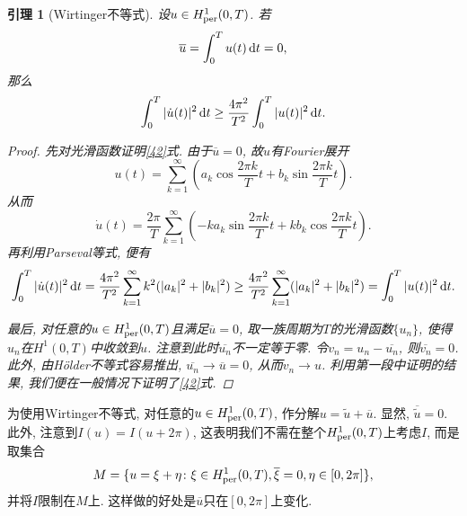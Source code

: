 \documentclass[12pt,a4paper]{article}
\newtheorem{lemma}[theorem]{引理}
\begin{document}
\begin{lemma}[Wirtinger不等式]
    设$u \in H_{{\rm per}}^1(0, T)$. 若 
    \begin{equation*}
        \overline{u} = \int_0^Tu(t) \,{\rm d}t = 0,
    \end{equation*}
    那么 
    \begin{equation}\label{42}
        \int_0^T|\dot u(t)|^2 \,{\rm d}t \geq \frac{4\pi^2}{T^2}\int_0^T|u(t)|^2 \,{\rm d}t.
    \end{equation}
    \begin{proof}
        先对光滑函数证明\eqref{42}式. 由于$\overline{u} = 0$, 故$u$有Fourier展开 
        \begin{equation*}
            u(t) = \sum_{k = 1}^{\infty}\left(a_k\cos\frac{2\pi k}{T}t + b_k\sin\frac{2\pi k}{T}t\right).
        \end{equation*}
        从而 
        \begin{equation*}
            \dot u(t) = \frac{2\pi}{T}\sum_{k = 1}^{\infty}\left(-ka_k\sin\frac{2\pi k}{T}t + kb_k\cos\frac{2\pi k}{T}t\right).
        \end{equation*}
        再利用Parseval等式, 便有 
        \begin{align*}
            \int_0^T|\dot u(t)|^2 \,{\rm d}t = \frac{4\pi^2}{T^2}\sum_{k = 1}^{\infty}k^2(|a_k|^2 + |b_k|^2) \geq \frac{4\pi^2}{T^2}\sum_{k = 1}^{\infty}(|a_k|^2 + |b_k|^2) = \int_0^T|u(t)|^2 \,{\rm d}t.
        \end{align*}

        最后, 对任意的$u \in H_{{\rm per}}^1(0, T)$且满足$\overline{u} = 0$, 取一族周期为$T$的光滑函数$\{u_n\}$, 使得$u_n$在$H^1(0, T)$中收敛到$u$.
        注意到此时$\overline{u_n}$不一定等于零. 令$v_n = u_n - \overline{u_n}$, 则$\overline{v_n} = 0$.
        此外, 由H\"older不等式容易推出, $\overline{u_n} \rightarrow \overline{u} = 0$, 从而$v_n \rightarrow u$.
        利用第一段中证明的结果, 我们便在一般情况下证明了\eqref{42}式.
    \end{proof}
\end{lemma}

为使用Wirtinger不等式, 对任意的$u \in H_{{\rm per}}^1(0, T)$, 作分解$u = \widetilde{u} + \overline{u}$.
显然, $\overline{\widetilde{u}} = 0$. 此外, 注意到$I(u) = I(u + 2\pi)$, 这表明我们不需在整个$H_{{\rm per}}^1(0, T)$上考虑$I$, 而是取集合 
\begin{equation*}
    M = \{u = \xi + \eta\colon \xi \in H_{{\rm per}}^1(0, T), \overline{\xi} = 0, \eta \in [0, 2\pi]\},
\end{equation*}
并将$I$限制在$M$上. 这样做的好处是$\overline{u}$只在$[0, 2\pi]$上变化.
\end{document}
